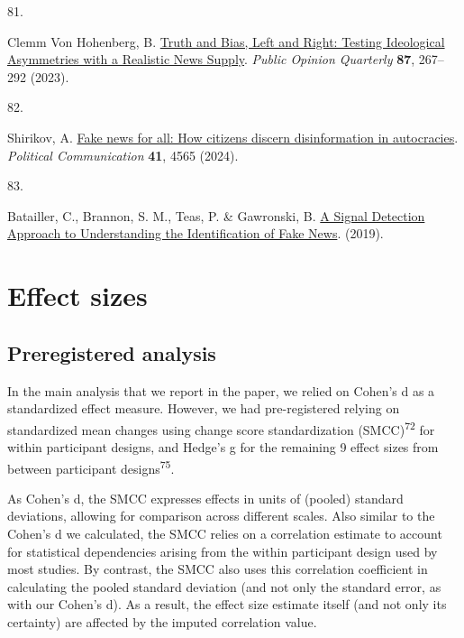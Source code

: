 \documentclass[
  doc,floatsintext]{apa6}
\newlength{\cslhangindent}
\newlength{\csllabelwidth}
\newenvironment{CSLReferences}[2] %
 {\begin{list}{}{%
  \setlength{\itemindent}{0pt}
  \setlength{\leftmargin}{0pt}
  \setlength{\parsep}{0pt}
  \ifodd #1
   \setlength{\leftmargin}{\cslhangindent}
   \setlength{\itemindent}{-1\cslhangindent}
  \fi
  \setlength{\itemsep}{#2\baselineskip}}}
 {\end{list}}
\newcommand{\CSLLeftMargin}[1]{\parbox[t]{\csllabelwidth}{\strut#1\strut}}
\newcommand{\CSLRightInline}[1]{\parbox[t]{\linewidth - \csllabelwidth}{\strut#1\strut}}
\begin{document}
\begin{CSLReferences}{0}{0}
\CSLLeftMargin{81. }%
\CSLRightInline{Clemm Von Hohenberg, B. \href{https://doi.org/10.1093/poq/nfad013}{Truth and Bias, Left and Right: Testing Ideological Asymmetries with a Realistic News Supply}. \emph{Public Opinion Quarterly} \textbf{87}, 267--292 (2023).}

\CSLLeftMargin{82. }%
\CSLRightInline{Shirikov, A. \href{https://doi.org/10.1080/10584609.2023.2257618}{Fake news for all: How citizens discern disinformation in autocracies}. \emph{Political Communication} \textbf{41}, 4565 (2024).}

\CSLLeftMargin{83. }%
\CSLRightInline{Batailler, C., Brannon, S. M., Teas, P. \& Gawronski, B. \href{https://osf.io/uc9me/}{A Signal Detection Approach to Understanding the Identification of Fake News}. (2019).}

\end{CSLReferences}

\newpage

\appendix


\section{Effect sizes}\label{effect-sizes}

\subsection{Preregistered analysis}\label{preregistered-analysis}

\FloatBarrier

In the main analysis that we report in the paper, we relied on Cohen's d as a standardized effect measure. However, we had pre-registered relying on standardized mean changes using change score standardization (SMCC)\textsuperscript{72} for within participant designs, and Hedge's g for the remaining 9 effect sizes from between participant designs\textsuperscript{75}.

As Cohen's d, the SMCC expresses effects in units of (pooled) standard deviations, allowing for comparison across different scales. Also similar to the Cohen's d we calculated, the SMCC relies on a correlation estimate to account for statistical dependencies arising from the within participant design used by most studies. By contrast, the SMCC also uses this correlation coefficient in calculating the pooled standard deviation (and not only the standard error, as with our Cohen's d). As a result, the effect size estimate itself (and not only its certainty) are affected by the imputed correlation value.
\end{document}
